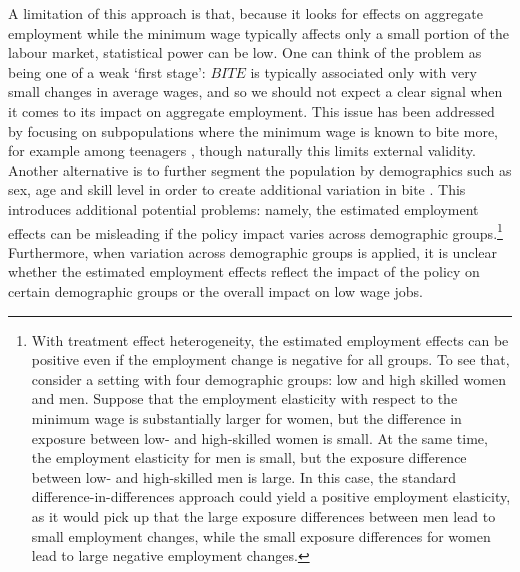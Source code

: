 A limitation of this approach is that, because it looks for effects on aggregate employment while the minimum wage typically affects only a small portion of the labour market, statistical power can be low. One can think of the problem as being one of a weak `first stage': $BITE$ is typically associated only with very small changes in average wages, and so we should not expect a clear signal when it comes to its impact on aggregate employment. This issue has been addressed by focusing on subpopulations where the minimum wage is known to bite more, for example among teenagers \citep{Card1992}, though naturally this limits external validity. Another alternative is to further segment the population by demographics such as sex, age and skill level in order to create additional variation in bite \citep{Stewart2002,Manning2016,Dube2019b}. This introduces additional potential problems: namely, the estimated employment effects can be misleading if the policy impact varies across demographic groups.\footnote{With treatment effect heterogeneity, the estimated employment effects can be positive even if the employment change is negative for all groups. To see that, consider a setting with four demographic groups: low and high skilled women and men. Suppose that the employment elasticity with respect to the minimum wage is substantially larger for women, but the difference in exposure between low- and high-skilled women is small. At the same time, the employment elasticity for men is small, but the exposure difference between low- and high-skilled men is large. In this case, the standard difference-in-differences approach could yield a positive employment elasticity, as it would pick up that the large exposure differences between men lead to small employment changes, while the small exposure differences for women lead to large negative employment changes.} Furthermore, when variation across demographic groups is applied, it is unclear whether the estimated employment effects reflect the impact of the policy on certain demographic groups or the overall impact on low wage jobs.  \par


